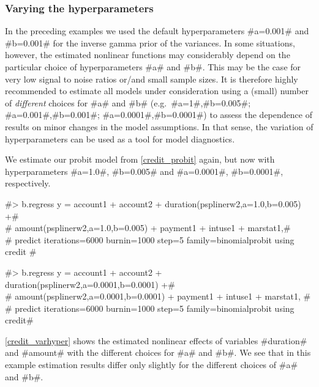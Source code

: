 \clearpage

\subsubsection{Varying the hyperparameters}

In the preceding examples we used the default hyperparameters
#a=0.001# and #b=0.001# for the inverse gamma prior of the
variances. In some situations, however, the estimated nonlinear
functions may considerably depend on the particular choice of
hyperparameters #a# and #b#. This may be the case for very low
signal to noise ratios or/and small sample sizes. It is therefore
highly recommended to estimate all models under consideration using
a (small) number of {\em different} choices for #a# and #b#
(e.g.~#a=1#,#b=0.005#; #a=0.001#,#b=0.001#; #a=0.0001#,#b=0.0001#)
to assess the dependence of results on minor changes in the model
assumptions. In that sense, the variation of hyperparameters can be
used as a tool for model diagnostics.

We estimate our probit model from \autoref{credit_probit} again, but
now with hyperparameters #a=1.0#, #b=0.005# and #a=0.0001#,
#b=0.0001#, respectively.

 #> b.regress  y = account1 + account2 + duration(psplinerw2,a=1.0,b=0.005) +# \\
 #  amount(psplinerw2,a=1.0,b=0.005) + payment1 + intuse1 + marstat1,# \\
 #  predict iterations=6000 burnin=1000 step=5 family=binomialprobit using credit #

 #> b.regress  y = account1 + account2 + duration(psplinerw2,a=0.0001,b=0.0001) +# \\
 #  amount(psplinerw2,a=0.0001,b=0.0001) + payment1 + intuse1 + marstat1, #\\
 #  predict iterations=6000 burnin=1000 step=5 family=binomialprobit using credit#

\autoref{credit_varhyper} shows the estimated nonlinear effects of
variables #duration# and #amount# with the different choices for #a#
and #b#. We see that in this example estimation results differ only
slightly for the different choices of #a# and #b#.


